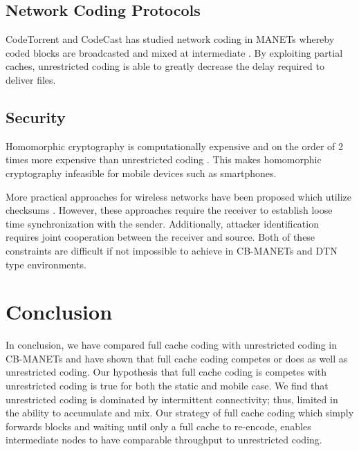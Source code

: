 \subsection{Network Coding Protocols}
CodeTorrent and CodeCast has studied network coding in MANETs whereby coded blocks are broadcasted and mixed at intermediate \cite{Lee:2006:CTC:1161252.1161254,4015713}. By exploiting partial caches, unrestricted coding is able to greatly decrease the delay required to deliver files.

\subsection{Security}
Homomorphic cryptography is computationally expensive and on the order of 2 times more expensive than unrestricted coding \cite{5978945}. This makes homomorphic cryptography infeasible for mobile devices such as smartphones.

More practical approaches for wireless networks have been proposed which utilize checksums \cite{dong2009practical}. However, these approaches require the receiver to establish loose time synchronization with the sender. Additionally, attacker identification requires joint cooperation between the receiver and source. Both of these constraints are difficult if not impossible to achieve in CB-MANETs and DTN type environments.

\section{Conclusion}
In conclusion, we have compared full cache coding with unrestricted coding in CB-MANETs and have shown that full cache coding competes or does as well as unrestricted coding. Our hypothesis that full cache coding is competes with unrestricted coding is true for both the static and mobile case. We find that unrestricted coding is dominated by intermittent connectivity; thus, limited in the ability to accumulate and mix. Our strategy of full cache coding which simply forwards blocks and waiting until only a full cache to re-encode, enables intermediate nodes to have comparable throughput to unrestricted coding. 

